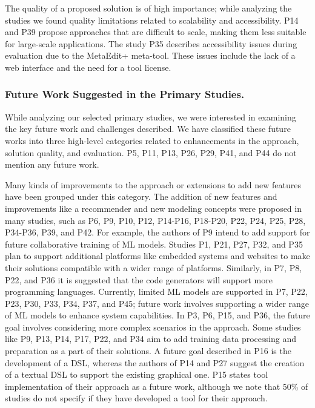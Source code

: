  The quality of a proposed solution is of high importance; while analyzing the studies we found quality limitations related to scalability and accessibility. P14 and P39 propose approaches that are difficult to scale, making them less suitable for large-scale applications. The study P35 describes accessibility issues during evaluation due to the MetaEdit+ meta-tool. These issues include the lack of a web interface and the need for a tool license. 

\subsubsection{Future Work Suggested in the Primary Studies.} 

While analyzing our selected primary studies, we were interested in examining the key future work and challenges described. We have classified these future works into three high-level categories related to enhancements in the approach, solution quality, and evaluation. P5, P11, P13, P26, P29, P41, and P44 do not mention any future work.


 Many kinds of improvements to the approach or extensions to add new features have been grouped under this category. The addition of new features and improvements like a recommender and new modeling concepts were proposed in many studies, such as P6, P9, P10, P12, P14-P16, P18-P20, P22, P24, P25, P28, P34-P36, P39, and P42. For example, the authors of P9 intend to add support for future collaborative training of ML models. Studies P1, P21, P27, P32, and P35 plan to support additional platforms like embedded systems and websites to make their solutions compatible with a wider range of platforms.  Similarly, in P7, P8, P22, and P36 it is suggested that the code generators will support more programming languages. Currently, limited ML models are supported in P7, P22, P23, P30, P33, P34, P37, and P45; future work involves supporting a wider range of ML models to enhance system capabilities. In P3, P6, P15, and P36, the future goal involves considering more complex scenarios in the approach. Some studies like P9, P13, P14, P17, P22, and P34 aim to add training data processing and preparation as a part of their solutions. A future goal described in P16 is the development of a DSL, whereas the authors of P14 and P27 suggest the creation of a textual DSL to support the existing graphical one. P15 states tool implementation of their approach as a future work, although we note that 50\% of studies do not specify if they have developed a tool for their approach.

